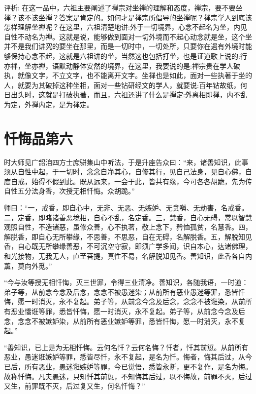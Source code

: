 \documentclass[12pt,twoside,openany]{book}
\newcommand{\kai}[1]{{\CJKfamily{kai}#1}}
\begin{document}
\kai{评析: 在这一品中，六祖主要阐述了禅宗对坐禅的理解和态度，禅宗，要不要坐禅？该不该坐禅？答案是肯定的。如何才是禅宗所倡导的坐禅呢？禅宗学人到底该怎样理解坐禅呢？在这里，六祖清楚地讲:外于一切境界，心念不起名为坐，内见自性不动名为禅。这就是说，能够做到面对一切外境而不起心动念就是坐，这个坐并不是我们讲究的要坐在那里，而是一切时中，一切处所，只要你在遇有外境时能够保持心念不起，这就是六祖讲的坐，当然这也包括打坐，也是证道歌上说的:行亦禅，坐亦禅，语默动静体安然的境界，在这里，我要说的是:禅宗贵在学人破执，就像文字，不立文字，也不能离开文字。坐禅也是如此，面对一些执著于坐的人，就要为其破掉这种坐相，面对一些钻研经文的学人，就要说:百年钻故纸，何日出头时，这就是打破执著，而且，六祖还讲了什么是禅定:外离相即禅，内不乱为定，外禅内定，是为禅定。}

\chapter{忏悔品第六}
时大师见广韶洎四方士庶骈集山中听法，于是升座告众曰：“来，诸善知识，此事须从自性中起，于一切时，念念自净其心，自修其行，见自己法身，见自心佛，自度自戒，始得不假到此。既从远来，一会于此，皆共有缘，今可各各胡跪，先为传自性五分法身香，次授无相忏悔。众胡跪。”

师曰：“一，戒香，即自心中，无非、无恶、无嫉妒、无贪嗔、无劫害，名戒香。二，定香，即睹诸善恶境相，自心不乱，名定香。三，慧香，自心无碍，常以智慧观照自性，不造诸恶，虽修众善，心不执著，敬上念下，矜恤孤贫，名慧香。四，解脱香，即自心无所攀缘，不思善，不思恶，自在无碍，名解脱香。五，解脱知见香，自心既无所攀缘善恶，不可沉空守寂，即须广学多闻，识自本心，达诸佛理，和光接物，无我无人，直至菩提，真性不易，名解脱知见香。善知识，此香各自内薰，莫向外觅。”

“今与汝等授无相忏悔，灭三世罪，令得三业清净。善知识，各随我语，一时道：弟子等，从前念今念及后念，念念不被愚迷染；从前所有恶业愚迷等罪，悉皆忏悔，愿一时消灭，永不复起。弟子等，从前念今念及后念，念念不被诳染，从前所有恶业憍诳等罪，悉皆忏悔，愿一时消灭，永不复起。弟子等，从前念今念及后念，念念不被嫉妒染，从前所有恶业嫉妒等罪，悉皆忏悔，愿一时消灭，永不复起。”

“善知识，已上是为无相忏悔。云何名忏？云何名悔？{\color{red}忏者，忏其前愆。}从前所有恶业，愚迷诳嫉妒等罪，悉皆尽忏，永不复起，是名为忏。{\color{red}悔者，悔其后过}，从今已后，所有恶业，愚迷诳嫉妒等罪，今已觉悟，悉皆永断，更不复作，是名为悔。故称忏悔。凡夫愚迷，只知忏其前愆，不知悔其后过，以不悔故，前罪不灭，后过又生，前罪既不灭，后过复又生，何名忏悔？”
\end{document}

